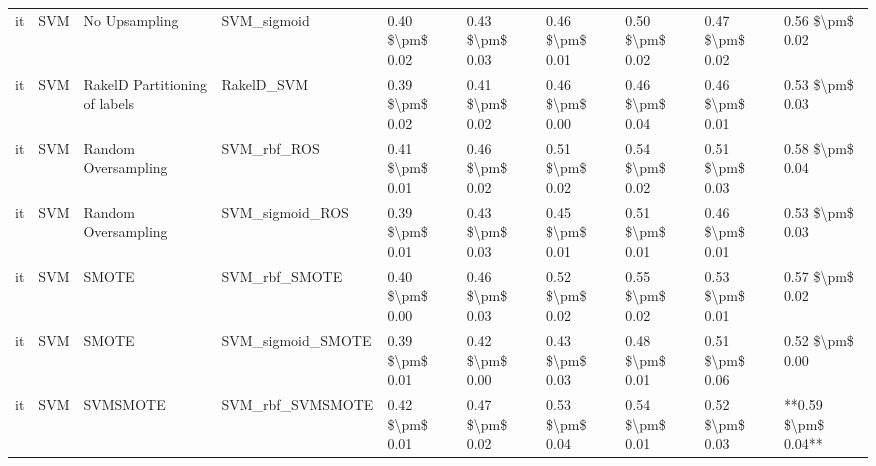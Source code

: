 \begin{tabular}{llllllllll}
      it &                             SVM &                 No Upsampling &                                  SVM\_sigmoid & 0.40 \$\textbackslash pm\$ 0.02 &           0.43 \$\textbackslash pm\$ 0.03 &       0.46 \$\textbackslash pm\$ 0.01 &        0.50 \$\textbackslash pm\$ 0.02 &                         0.47 \$\textbackslash pm\$ 0.02 &     0.56 \$\textbackslash pm\$ 0.02 \\
      it &                             SVM & RakelD Partitioning of labels &                                   RakelD\_SVM & 0.39 \$\textbackslash pm\$ 0.02 &           0.41 \$\textbackslash pm\$ 0.02 &       0.46 \$\textbackslash pm\$ 0.00 &        0.46 \$\textbackslash pm\$ 0.04 &                         0.46 \$\textbackslash pm\$ 0.01 &     0.53 \$\textbackslash pm\$ 0.03 \\
      it &                             SVM &           Random Oversampling &                                  SVM\_rbf\_ROS & 0.41 \$\textbackslash pm\$ 0.01 &           0.46 \$\textbackslash pm\$ 0.02 &       0.51 \$\textbackslash pm\$ 0.02 &        0.54 \$\textbackslash pm\$ 0.02 &                         0.51 \$\textbackslash pm\$ 0.03 &     0.58 \$\textbackslash pm\$ 0.04 \\
      it &                             SVM &           Random Oversampling &                              SVM\_sigmoid\_ROS & 0.39 \$\textbackslash pm\$ 0.01 &           0.43 \$\textbackslash pm\$ 0.03 &       0.45 \$\textbackslash pm\$ 0.01 &        0.51 \$\textbackslash pm\$ 0.01 &                         0.46 \$\textbackslash pm\$ 0.01 &     0.53 \$\textbackslash pm\$ 0.03 \\
      it &                             SVM &                         SMOTE &                                SVM\_rbf\_SMOTE & 0.40 \$\textbackslash pm\$ 0.00 &           0.46 \$\textbackslash pm\$ 0.03 &       0.52 \$\textbackslash pm\$ 0.02 &        0.55 \$\textbackslash pm\$ 0.02 &                         0.53 \$\textbackslash pm\$ 0.01 &     0.57 \$\textbackslash pm\$ 0.02 \\
      it &                             SVM &                         SMOTE &                            SVM\_sigmoid\_SMOTE & 0.39 \$\textbackslash pm\$ 0.01 &           0.42 \$\textbackslash pm\$ 0.00 &       0.43 \$\textbackslash pm\$ 0.03 &        0.48 \$\textbackslash pm\$ 0.01 &                         0.51 \$\textbackslash pm\$ 0.06 &     0.52 \$\textbackslash pm\$ 0.00 \\
      it &                             SVM &                      SVMSMOTE &                             SVM\_rbf\_SVMSMOTE & 0.42 \$\textbackslash pm\$ 0.01 &           0.47 \$\textbackslash pm\$ 0.02 &       0.53 \$\textbackslash pm\$ 0.04 &        0.54 \$\textbackslash pm\$ 0.01 &                         0.52 \$\textbackslash pm\$ 0.03 & **0.59 \$\textbackslash pm\$ 0.04** \\

\end{tabular}
